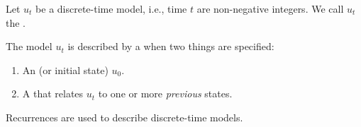 \documentclass[../main.tex]{subfiles}
\begin{document}
\begin{definition}[recurrence] \label{def:recurrence}
  Let \(u_{t}\) be a discrete-time model, i.e., time \(t\) are non-negative integers.  We call \(u_{t}\) the .

  The model \(u_{t}\) is described by a  when two things are specified:
  \begin{enumerate}
    \item An  (or initial state) \(u_{0}\).
    \item A  that relates  \(u_{t}\) to one or more \emph{previous} states.
  \end{enumerate}

  \faExclamationTriangle{} Recurrences are used to describe discrete-time models.
\end{definition}
\end{document}
